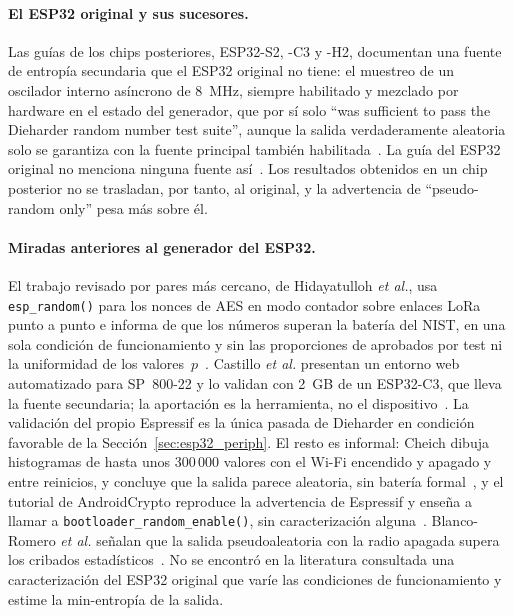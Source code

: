 \paragraph{El ESP32 original y sus sucesores.} Las guías de los chips
posteriores, ESP32-S2, -C3 y -H2, documentan una fuente de entropía
secundaria que el ESP32 original no tiene: el muestreo de un oscilador
interno asíncrono de 8~MHz, siempre habilitado y mezclado por hardware en
el estado del generador, que por sí solo ``was sufficient to pass the
Dieharder random number test suite'', aunque la salida verdaderamente
aleatoria solo se garantiza con la fuente principal también
habilitada~\cite{espressif_idf_random_c3}. La guía del ESP32 original no
menciona ninguna fuente así~\cite{espressif_idf_random}. Los resultados
obtenidos en un chip posterior no se trasladan, por tanto, al original, y
la advertencia de ``pseudo-random only'' pesa más sobre él.

\paragraph{Miradas anteriores al generador del ESP32.} El trabajo
revisado por pares más cercano, de Hidayatulloh \emph{et al.}, usa
\texttt{esp\_\allowbreak{}random()} para los nonces de AES en modo contador sobre
enlaces LoRa punto a punto e informa de que los números superan la
batería del NIST, en una sola condición de funcionamiento y sin las
proporciones de aprobados por test ni la uniformidad de los
valores~$p$~\cite{hidayatulloh_2024_performance}. Castillo \emph{et al.}
presentan un entorno web automatizado para SP~800-22 y lo validan con
2~GB de un ESP32-C3, que lleva la fuente secundaria; la aportación es la
herramienta, no el dispositivo~\cite{castillo_2026_automated}. La
validación del propio Espressif es la única pasada de Dieharder en
condición favorable de la Sección~\ref{sec:esp32_periph}. El resto es
informal: Cheich dibuja histogramas de hasta unos 300\,000 valores con el
Wi-Fi encendido y apagado y entre reinicios, y concluye que la salida
parece aleatoria, sin batería formal~\cite{cheich_2025_esp32}, y el
tutorial de AndroidCrypto reproduce la advertencia de Espressif y enseña
a llamar a \texttt{bootloader\_\allowbreak{}random\_\allowbreak{}enable()}, sin caracterización
alguna~\cite{androidcrypto_esp32}. Blanco-Romero \emph{et al.} señalan
que la salida pseudoaleatoria con la radio apagada supera los cribados
estadísticos~\cite{blancoromero_2026_entropy}. No se encontró en la
literatura consultada una caracterización del ESP32 original que varíe
las condiciones de funcionamiento y estime la min-entropía de la salida.

